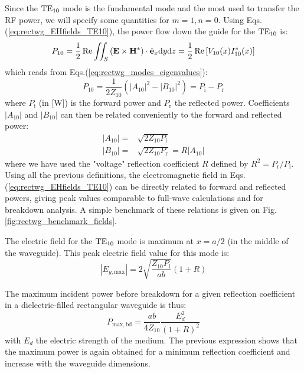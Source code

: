 Since the ${\mathrm{TE}}_{10}$ mode is the fundamental mode and the most used to transfer the RF power, we will specify some quantities for $m=1,n=0$. Using Eqs.(\ref{eq:rectwg_EHfields_TE10}), the power flow down the guide for the ${\mathrm{TE}}_{10}$ is:
\begin{equation}
	P_{10} = \frac{1}{2} \Re \iint_S  \left({\mathbf E} \times {\mathbf H}^* \right)\cdot \hat{{\mathbf e}}_x {\mathrm{d}} y {\mathrm{d}} z
	= \frac{1}{2} \Re\left[V_{10}(x) I^*_{10}(x) \right]
	\label{eq:rectwg_poynting_TE10_V10_I10}
\end{equation}
which reads from Eqs.(\ref{eq:rectwg_modes_eigenvalues}):
\begin{equation}
	P_{10} = \frac{1}{2Z_{10}}\left(\left|A_{10}\right|^{2}-\left|B_{10}\right|^{2}\right)
	\label{eq:rectwg_poynting_TE10_A10_B10} = P_\mathrm{i} -  P_\mathrm{r}
\end{equation}
where $P_\mathrm{i}$ (in [\si{W}]) is the forward power and $P_\mathrm{r}$ the reflected power. Coefficients $|A_{10}|$ and $|B_{10}|$ can then be related conveniently to the forward and reflected power:
\begin{subequations}
	\begin{align}
	|A_{10}| =& \sqrt{2Z_{10} P_\mathrm{i}} \\
	|B_{10}| =& \sqrt{2Z_{10} P_\mathrm{r}} =  R |A_{10}|
	\end{align}	
\end{subequations}	
where we have used the "voltage" reflection coefficient $R$ defined by $R^2=P_\mathrm{r}/P_\mathrm{i}$. Using all the previous definitions, the electromagnetic field in Eqs.(\ref{eq:rectwg_EHfields_TE10}) can be directly related to forward and reflected powers, giving peak values comparable to full-wave calculations and for breakdown analysis. A simple benchmark of these relations is given on Fig.\ref{fig:rectwg_benchmark_fields}.

The electric field for the ${\mathrm{TE}}_{10}$ mode is maximum at $x=a/2$ (in the middle of the waveguide). This peak electric field value for this mode is:
\begin{equation}
	\left| E_{y,\mathrm{max}} \right|
	=
	2 \sqrt{\frac{Z_{10} P_\mathrm{i}}{a b }} 
		\left( 
			1 + R
		\right)
\end{equation}

The maximum incident power before breakdown for a given reflection coefficient in a dielectric-filled rectangular waveguide is thus:
\begin{equation}
	P_{\mathrm{max,bd}}
	= 
	\frac{a b}{4 Z_{10}} \frac{E_d^2}{\left(1 + R\right)^2}
\end{equation}
with $E_d$ the electric strength of the medium. The previous expression shows that the maximum power is again obtained for a minimum reflection coefficient and increase with the waveguide dimensions. 

